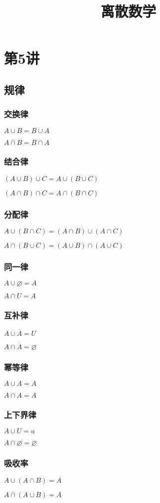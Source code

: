 \documentclass{ctexart}
\title{离散数学 }
\begin{document}
\section{第5讲}
\subsection{规律}
\subsubsection{交换律}
$A \cup B = B \cup A$

$A \cap B = B \cap A$
\subsubsection{结合律}
$(A \cup B) \cup C = A \cup (B \cup C)$

$(A \cap B) \cap C = A \cap (B \cap C)$
\subsubsection{分配律}
$A \cup (B \cap C) = (A \cap B) \cup (A \cap C)$

$A \cap (B \cup C) = (A \cup B) \cap (A \cup C)$
\subsubsection{同一律}
$A \cup \varnothing = A $

$A \cap U = A$
\subsubsection{互补律}
$A \cup \overline{A} = U$

$A \cap \overline{A} = \varnothing$
\subsubsection{幂等律}
$A \cup A = A$

$A \cap A = A$
\subsubsection{上下界律}
$A \cup U = u$

$A \cap \varnothing = \varnothing$
\subsubsection{吸收率}
$A \cup (A \cap B) = A$

$A \cap (A \cup B) = A$
\end{document}
